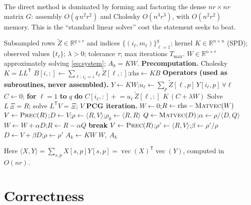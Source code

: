 \documentclass[12pt]{article}
\DeclareMathOperator{\vecop}{vec}
\newcommand{\bR}{\mathbb{R}}
\begin{document}
The direct method is dominated by forming and factoring the dense $nr\times nr$
matrix $G$: assembly $O(q\,n^2r^2)$ and Cholesky $O(n^3r^3)$, with $O(n^2r^2)$
memory. This is the ``standard linear solver'' cost the statement seeks to beat.

\begin{algorithm}[h]
\caption{Matrix-free Preconditioned CG for \eqref{eq:system}}
\label{alg:pcg}
\begin{algorithmic}[1]
\Require Subsampled rows $\tilde Z\in\bR^{q\times r}$ and indices
  $\{(i_\ell,m_\ell)\}_{\ell=1}^q$; kernel $K\in\bR^{n\times n}$ (SPD); observed
  values $\{t_\ell\}$; $\lambda>0$; tolerance $\tau$; max iterations $T_{\max}$.
\Ensure $W\in\bR^{n\times r}$ approximately solving \eqref{eq:system}; $A_k=KW$.
\Statex \textbf{Precomputation.}
\State Cholesky $K=LL^{\mathsf T}$ 
\State $B[i,:]\gets\sum_{\ell:\,i_\ell=i}t_\ell\,\tilde Z[\ell,:]$;\quad $\mathrm{rhs}\gets KB$
\Statex \textbf{Operators (used as subroutines, never assembled).}
  \State $Y\gets KW$;\quad $u_\ell\gets\sum_p\tilde Z[\ell,p]\,Y[i_\ell,p]\ \forall\ell$
  \State $C\gets 0$; \textbf{for} $\ell=1$ \textbf{to} $q$ \textbf{do} $C[i_\ell,:]\mathrel{+}=u_\ell\,\tilde Z[\ell,:]$
  \State \Return $K\,(C+\lambda W)$
\EndFunction
{}
  \State Solve $L\,\Xi=R$; solve $L^{\mathsf T}V=\Xi$; \Return $V$
\EndFunction
\Statex \textbf{PCG iteration.}
\State $W\gets 0$;\quad $R\gets\mathrm{rhs}-\Call{Matvec}{W}$
\State $V\gets\Call{Prec}{R}$;\quad $D\gets V$;\quad $\rho\gets\langle R,V\rangle$;\quad $\rho_0\gets\langle R,R\rangle$
  \State $Q\gets\Call{Matvec}{D}$;\quad $\alpha\gets\rho/\langle D,Q\rangle$
  \State $W\gets W+\alpha D$;\quad $R\gets R-\alpha Q$
   \textbf{break}\EndIf
  \State $V\gets\Call{Prec}{R}$;\quad $\rho'\gets\langle R,V\rangle$;\quad $\beta\gets\rho'/\rho$
  \State $D\gets V+\beta D$;\quad $\rho\gets\rho'$
\EndFor
\State $A_k\gets KW$ 
\State \Return $W,\ A_k$
\end{algorithmic}
\end{algorithm}

Here $\langle X,Y\rangle=\sum_{s,p}X[s,p]Y[s,p]=\vecop(X)^{\mathsf T}\vecop(Y)$,
computed in $O(nr)$.

\section{Correctness}
\end{document}
